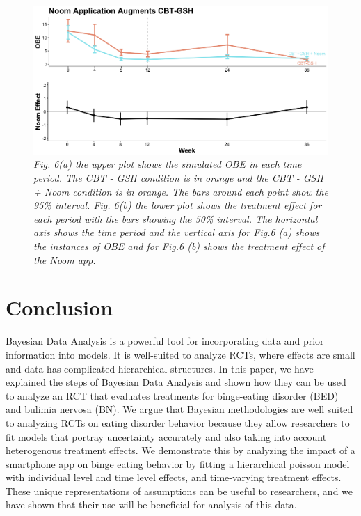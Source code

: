 \documentclass{article}
\begin{document}
\begin{figure}[H]
\begin{center}
\includegraphics[width=\textwidth, height=\textheight, keepaspectratio]{noom_effect.png}
\caption{\emph{Fig. 6(a) the upper plot shows the simulated OBE in each time period. The CBT - GSH condition is in orange and the CBT - GSH + Noom condition is in orange. The bars around each point show the 95\% interval. Fig. 6(b) the lower plot shows the treatment effect for each period with the bars showing the 50\% interval. The horizontal axis shows the time period and the vertical axis for Fig.6 (a) shows the instances of OBE and for Fig.6 (b) shows the treatment effect of the Noom app.}}
\end{center}
\end{figure}


\section{Conclusion}
Bayesian Data Analysis is a powerful tool for incorporating data and prior information into models.  It is well-suited to analyze RCTs, where effects are small and data has complicated hierarchical structures.  In this paper, we have explained the steps of Bayesian Data Analysis and shown how they can be used to analyze an RCT that evaluates treatments for binge-eating disorder (BED) and bulimia nervosa (BN).  We argue that Bayesian methodologies are well suited to analyzing RCTs on eating disorder behavior because they allow researchers to fit models that portray uncertainty accurately and also taking into account heterogenous treatment effects. We demonstrate this by analyzing the impact of a smartphone app on binge eating behavior by fitting a hierarchical poisson model with individual level and time level effects, and time-varying treatment effects.  These unique representations of assumptions can be useful to researchers, and we have shown that their use will be beneficial for analysis of this data.
\end{document}
